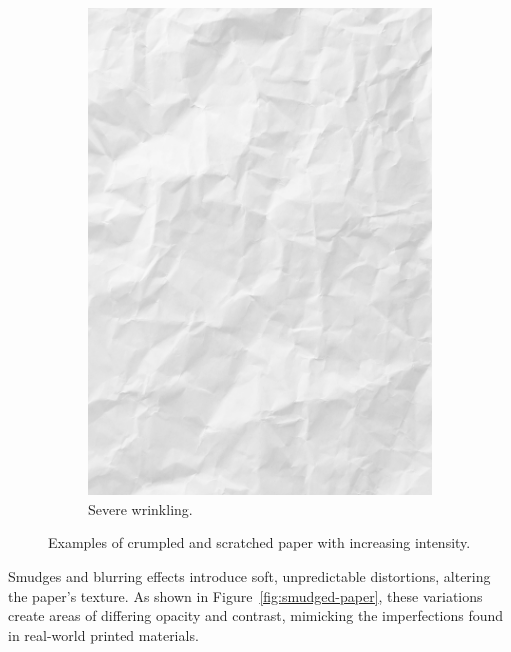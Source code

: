 \begin{figure}
\begin{subfigure}{0.3\textwidth}
        \includegraphics[width=\textwidth]{images/005.jpg}
        \caption{Severe wrinkling.}
    \end{subfigure}
    \caption{Examples of crumpled and scratched paper with increasing intensity.}\label{fig:creased-paper}
\end{figure}

Smudges and blurring effects introduce soft, unpredictable distortions, altering the paper's texture. As shown in Figure~\ref{fig:smudged-paper}, these variations create areas of differing opacity and contrast, mimicking the imperfections found in real-world printed materials.


